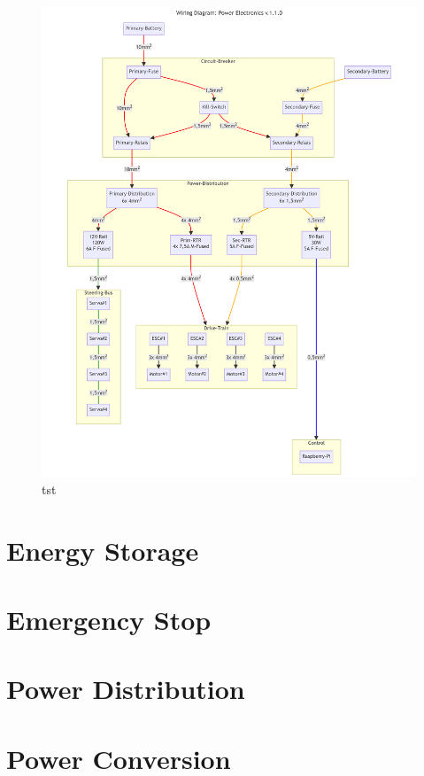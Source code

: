     \begin{figure}[h!]
    \centering
    \includegraphics[width=1\textwidth]{contents/figures/wiring-diagram-p-v1.1.0.png}
    \caption{tst}
    \label{wiring_power}
    \end{figure}

    




\section{Energy Storage}

\section{Emergency Stop}

\section{Power Distribution}

\section{Power Conversion}

